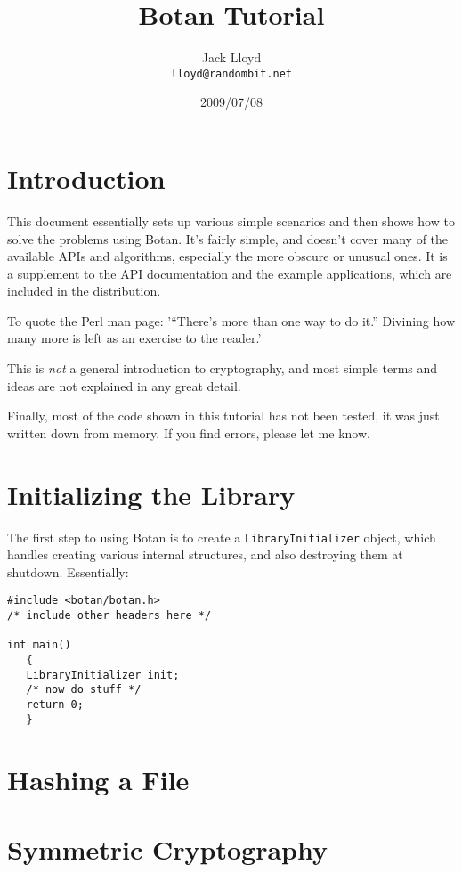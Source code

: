 \documentclass{article}
\title{\textbf{Botan Tutorial}}
\author{Jack Lloyd \\
        \texttt{lloyd@randombit.net}}
\date{2009/07/08}
\newcommand{\type}[1]{\texttt{#1}}
\begin{document}
\maketitle

\tableofcontents

\parskip=5pt
\pagebreak

\section{Introduction}

This document essentially sets up various simple scenarios and then
shows how to solve the problems using Botan. It's fairly simple, and
doesn't cover many of the available APIs and algorithms, especially
the more obscure or unusual ones. It is a supplement to the API
documentation and the example applications, which are included in the
distribution.

To quote the Perl man page: '``There's more than one way to do it.''
Divining how many more is left as an exercise to the reader.'

This is \emph{not} a general introduction to cryptography, and most simple
terms and ideas are not explained in any great detail.

Finally, most of the code shown in this tutorial has not been tested, it was
just written down from memory. If you find errors, please let me know.

\section{Initializing the Library}

The first step to using Botan is to create a \type{LibraryInitializer} object,
which handles creating various internal structures, and also destroying them at
shutdown. Essentially:

\begin{verbatim}
#include <botan/botan.h>
/* include other headers here */

int main()
   {
   LibraryInitializer init;
   /* now do stuff */
   return 0;
   }
\end{verbatim}

\section{Hashing a File}

\section{Symmetric Cryptography}
\end{document}
